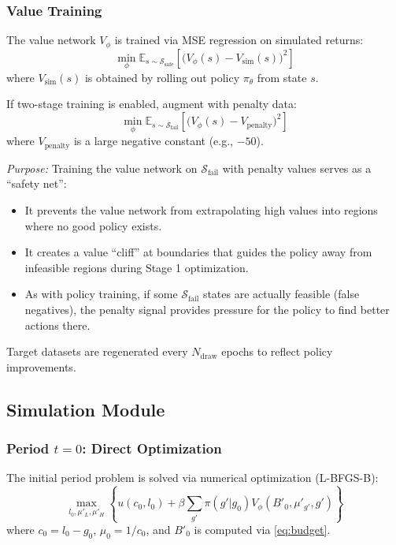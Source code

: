 \subsubsection{Value Training}
The value network $V_\phi$ is trained via MSE regression on simulated returns:
\begin{equation}
    \min_\phi \mathbb{E}_{s \sim \mathcal{S}_{\text{safe}}} \left[ \bigl(V_\phi(s) - V_{\text{sim}}(s)\bigr)^2 \right]
\end{equation}
where $V_{\text{sim}}(s)$ is obtained by rolling out policy $\pi_\theta$ from state $s$.

If two-stage training is enabled, augment with penalty data:
\begin{equation}
    \min_\phi \mathbb{E}_{s \sim \mathcal{S}_{\text{fail}}} \left[ \bigl(V_\phi(s) - V_{\text{penalty}}\bigr)^2 \right]
\end{equation}
where $V_{\text{penalty}}$ is a large negative constant (e.g., $-50$).

\textit{Purpose:} Training the value network on $\mathcal{S}_{\text{fail}}$ with penalty values serves as a ``safety net'':
\begin{itemize}
    \item It prevents the value network from extrapolating high values into regions where no good policy exists.
    \item It creates a value ``cliff'' at boundaries that guides the policy away from infeasible regions during Stage 1 optimization.
    \item As with policy training, if some $\mathcal{S}_{\text{fail}}$ states are actually feasible (false negatives), the penalty signal provides pressure for the policy to find better actions there.
\end{itemize}

Target datasets are regenerated every $N_{\text{draw}}$ epochs to reflect policy improvements.


\subsection{Simulation Module}

\subsubsection{Period $t = 0$: Direct Optimization}
The initial period problem is solved via numerical optimization (L-BFGS-B):
\begin{equation}
    \max_{l_0, \mu'_L, \mu'_H} \left\{ u(c_0, l_0) + \beta \sum_{g'} \pi(g'|g_0) V_\phi(B'_0, \mu'_{g'}, g') \right\}
\end{equation}
where $c_0 = l_0 - g_0$, $\mu_0 = 1/c_0$, and $B'_0$ is computed via \eqref{eq:budget}.


